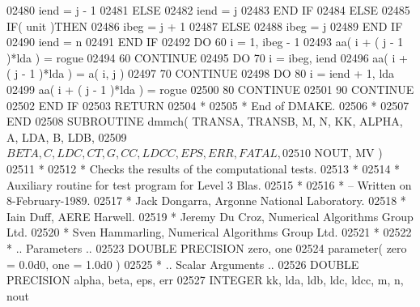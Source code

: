 \begin{DoxyCode}
02480                   iend = j - 1
02481                \textcolor{keywordflow}{ELSE}
02482                   iend = j
02483 \textcolor{keywordflow}{               END IF}
02484             \textcolor{keywordflow}{ELSE}
02485                \textcolor{keywordflow}{IF}( unit )\textcolor{keywordflow}{THEN}
02486                   ibeg = j + 1
02487                \textcolor{keywordflow}{ELSE}
02488                   ibeg = j
02489 \textcolor{keywordflow}{               END IF}
02490                iend = n
02491 \textcolor{keywordflow}{            END IF}
02492             \textcolor{keywordflow}{DO} 60 i = 1, ibeg - 1
02493                aa( i + ( j - 1 )*lda ) = rogue
02494    60       \textcolor{keywordflow}{CONTINUE}
02495             \textcolor{keywordflow}{DO} 70 i = ibeg, iend
02496                aa( i + ( j - 1 )*lda ) = a( i, j )
02497    70       \textcolor{keywordflow}{CONTINUE}
02498             \textcolor{keywordflow}{DO} 80 i = iend + 1, lda
02499                aa( i + ( j - 1 )*lda ) = rogue
02500    80       \textcolor{keywordflow}{CONTINUE}
02501    90    \textcolor{keywordflow}{CONTINUE}
02502 \textcolor{keywordflow}{      END IF}
02503       \textcolor{keywordflow}{RETURN}
02504 \textcolor{comment}{*}
02505 \textcolor{comment}{*     End of DMAKE.}
02506 \textcolor{comment}{*}
02507 \textcolor{keyword}{      END}
02508 \textcolor{keyword}{      SUBROUTINE }dmmch( TRANSA, TRANSB, M, N, KK, ALPHA, A, LDA, B, LDB,
02509      $                  BETA, C, LDC, CT, G, CC, LDCC, EPS, ERR, FATAL,
02510      $                  NOUT, MV )
02511 \textcolor{comment}{*}
02512 \textcolor{comment}{*  Checks the results of the computational tests.}
02513 \textcolor{comment}{*}
02514 \textcolor{comment}{*  Auxiliary routine for test program for Level 3 Blas.}
02515 \textcolor{comment}{*}
02516 \textcolor{comment}{*  -- Written on 8-February-1989.}
02517 \textcolor{comment}{*     Jack Dongarra, Argonne National Laboratory.}
02518 \textcolor{comment}{*     Iain Duff, AERE Harwell.}
02519 \textcolor{comment}{*     Jeremy Du Croz, Numerical Algorithms Group Ltd.}
02520 \textcolor{comment}{*     Sven Hammarling, Numerical Algorithms Group Ltd.}
02521 \textcolor{comment}{*}
02522 \textcolor{comment}{*     .. Parameters ..}
02523       \textcolor{keywordtype}{DOUBLE PRECISION}   zero, one
02524       parameter( zero = 0.0d0, one = 1.0d0 )
02525 \textcolor{comment}{*     .. Scalar Arguments ..}
02526       \textcolor{keywordtype}{DOUBLE PRECISION}   alpha, beta, eps, err
02527       \textcolor{keywordtype}{INTEGER}            kk, lda, ldb, ldc, ldcc, m, n, nout

\end{DoxyCode}
